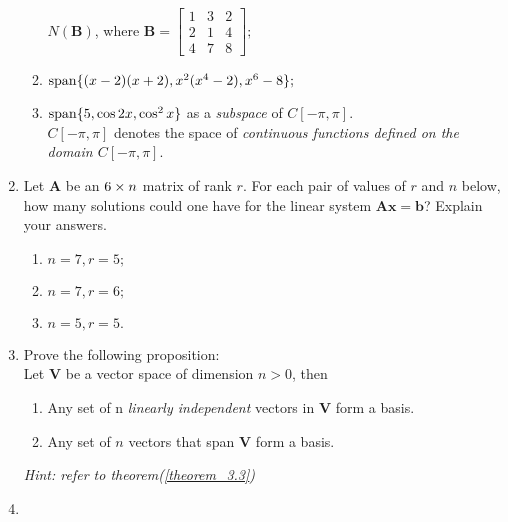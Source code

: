 \begin{enumerate}
\begin{enumerate}
$N(\bm B)$, where $\bm B=\begin{bmatrix}
1&3&2\\2&1&4\\4&7&8
\end{bmatrix};$
\item
$\operatorname{span}\{(x-2)(x+2),x^2(x^4-2),x^6-8\};$
\item
$\operatorname{span}\{5,\cos 2x,\cos^2 x\}$ as a \textit{subspace} of $C[-\pi,\pi].$\\
$C[-\pi,\pi]$ denotes the space of \textit{continuous functions defined on the domain $C[-\pi,\pi].$}
\end{enumerate}
\item
Let $\bm A$ be an $6\times n$ matrix of rank $r$. For each pair of values of $r$ and $n$ below, how many solutions could one have for the linear system $\bm{Ax}=\bm b$? Explain your answers.
\begin{enumerate}
\item
$n=7,r=5;$
\item
$n=7,r=6;$
\item
$n=5,r=5.$
\end{enumerate}
\item
Prove the following proposition:\\
Let $\bm V$ be a vector space of dimension $n>0$, then
\begin{enumerate}
\item
Any set of n \textit{linearly independent} vectors in $\bm V$ form a basis.
\item
Any set of $n$ vectors that span $\bm V$ form a basis.
\end{enumerate}
\textit{Hint: refer to theorem(\ref{theorem_3.3})}
\item
{}
\end{enumerate}
